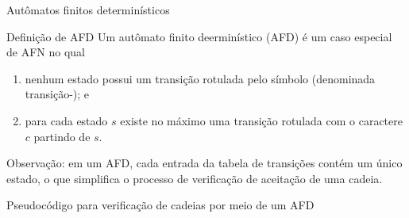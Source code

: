 \begin{frame}[fragile]{Autômatos finitos determinísticos}

    \begin{block}{Definição de AFD}
        Um autômato finito deerminístico (AFD) é um caso especial de AFN no qual
        \begin{enumerate}
            \item nenhum estado possui um transição rotulada pelo símbolo  (denominada transição-); e
            \item para cada estado $s$ existe no máximo uma transição rotulada com o caractere $c$ partindo de $s$.
        \end{enumerate}
    \end{block}

    \vspace{0.2in}

    Observação: em um AFD, cada entrada da tabela de transições contém um único estado, o que simplifica o processo de verificação de aceitação de uma cadeia.
\end{frame}

\begin{frame}[fragile]{Pseudocódigo para verificação de cadeias por meio de um AFD}

    \begin{algorithmic}[1]
        \vspace{0.2in}
        \Statex
        \EndWhile
        \Statex
            \State {}
        \Else
            \State {}
        \EndIf
    \end{algorithmic}

\end{frame}

